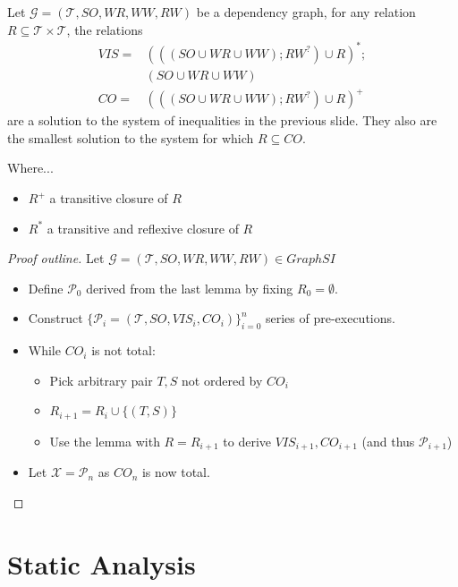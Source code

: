 \documentclass{beamer}
\begin{document}
\begin{frame}
	\begin{lemma}
		Let $\mathcal{G} = (\mathcal{T}, SO, WR, WW, RW)$ be a dependency graph, for any relation $R \subseteq \mathcal{T} \times \mathcal{T}$, the relations
		$$
			\begin{aligned}
				VIS = {} & (((SO \cup WR \cup WW); RW^?) \cup R)^*; \\
				         & (SO \cup WR \cup WW) \\
				 CO = {} & (((SO \cup WR \cup WW); RW^?) \cup R)^+
			\end{aligned}
		$$
		are a solution to the system of inequalities in the previous slide. They also are the smallest solution to the system for which $R \subseteq CO$.
	\end{lemma}
	Where... 
	\begin{itemize}
		\item $R^+$ a transitive closure of $R$
		\item $R^*$ a transitive and reflexive closure of $R$
	\end{itemize}
\end{frame}

\begin{frame}
	\begin{proof}[Proof outline]
		Let $\mathcal{G} = (\mathcal{T}, SO, WR, WW, RW) \in GraphSI$
		\begin{itemize}
			\item Define $\mathcal{P}_0$ derived from the last lemma by fixing $R_0 = \emptyset$.
			\item Construct $\{\mathcal{P}_i = (\mathcal{T}, SO, VIS_i, CO_i)\}^n_{i=0}$ series of pre-executions.
			\item While $CO_i$ is not total:
			\begin{itemize}
				\item Pick arbitrary pair $T,S$ not ordered by $CO_i$
				\item $R_{i+1} = R_i \cup \{(T,S)\}$
				\item Use the lemma with $R = R_{i+1}$ to derive $VIS_{i+1}, CO_{i+1}$ (and thus $\mathcal{P}_{i+1}$)
			\end{itemize}
			\item Let $\mathcal{X} = \mathcal{P}_n$ as $CO_n$ is now total.	
		\end{itemize}
	\end{proof}
\end{frame}

\section{Static Analysis}
\end{document}
